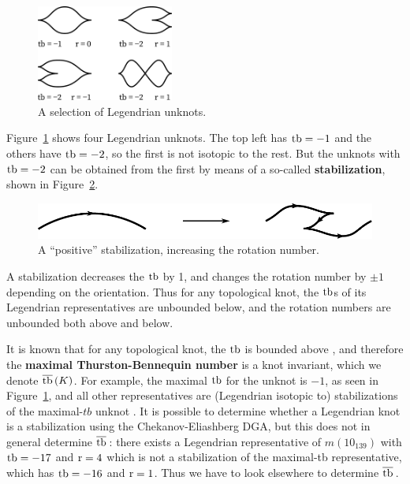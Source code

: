 \begin{figure}[ht]
    \centering
    \includegraphics[width=0.4\textwidth]{images/unknots.pdf}
    \caption{A selection of Legendrian unknots.}%
    \label{fig:unknots}
\end{figure}

Figure~\ref{fig:unknots} shows four Legendrian unknots. The top left has $\operatorname{tb} = -1$ and the others have $\operatorname{tb} = -2$, so the first is not isotopic to the rest. But the unknots with $\operatorname{tb} = -2$ can be obtained from the first by means of a so-called \textbf{stabilization}, shown in Figure~\ref{fig:stabilization}. 

\begin{figure}[ht]
    \centering
    \includegraphics[width=0.6\linewidth]{images/stabilization.pdf}
    \caption{A ``positive'' stabilization, increasing the rotation number.}%
    \label{fig:stabilization}
\end{figure}

A stabilization decreases the $\operatorname{tb}$ by 1, and changes the rotation number by $\pm 1$ depending on the orientation. Thus for any topological knot, the $\operatorname{tb}$s of its Legendrian representatives are unbounded below, and the rotation numbers are unbounded both above and below.


It is known that for any topological knot, the $\operatorname{tb}$ is bounded above \cite{bennequin}, and therefore the \textbf{maximal Thurston-Bennequin number} is a knot invariant, which we denote $\overline{\operatorname{tb}}\,(K)$.
For example, the maximal $\operatorname{tb}$ for the unknot is $-1$, as seen in Figure~\ref{fig:unknots}, and all other representatives are (Legendrian isotopic to) stabilizations of the maximal-$tb$ unknot \cite{atlas}. It is possible to determine whether a Legendrian knot is a stabilization using the Chekanov-Eliashberg DGA, but this does not in general determine $\overline{\operatorname{tb}}\,$: there exists a Legendrian representative of $m(10_{139})$ with $\operatorname{tb} = -17$ and $\operatorname{r} = 4$ which is not a stabilization of the maximal-tb representative, which has $\operatorname{tb} = -16$ and $\operatorname{r} = 1$. Thus we have to look elsewhere to determine $\overline{\operatorname{tb}}\,$.

